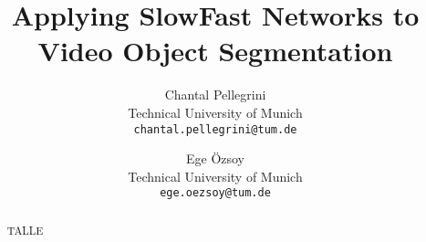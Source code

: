 \documentclass[10pt,twocolumn,letterpaper]{article}
\begin{document}
\title{Applying SlowFast Networks to Video Object Segmentation}

\author{Chantal Pellegrini\\
Technical University of Munich\\
{\tt\small chantal.pellegrini@tum.de}
\and
Ege Özsoy\\
	Technical University of Munich\\
	{\tt\small ege.oezsoy@tum.de}
}

\maketitle

\begin{abstract}
TALLE
\end{abstract}








{\small


}
\end{document}
